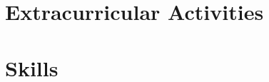 \documentclass{prometheus_cv}
\begin{document}
\section{Extracurricular Activities}



% 


\section{Skills}

\end{document}
